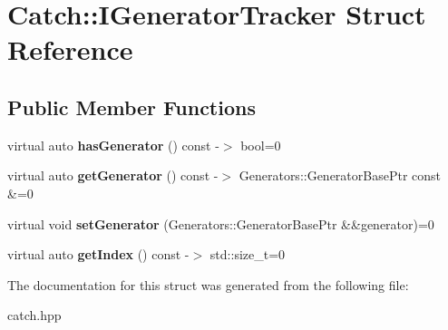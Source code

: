 \hypertarget{structCatch_1_1IGeneratorTracker}{}\section{Catch\+:\+:I\+Generator\+Tracker Struct Reference}
\label{structCatch_1_1IGeneratorTracker}
\subsection*{Public Member Functions}
\begin{DoxyCompactItemize}
\item 
virtual auto {\bfseries has\+Generator} () const -\/$>$ bool=0\hypertarget{structCatch_1_1IGeneratorTracker_ae88084f9af27c8b9a5d5775b9c148498}{}\label{structCatch_1_1IGeneratorTracker_ae88084f9af27c8b9a5d5775b9c148498}

\item 
virtual auto {\bfseries get\+Generator} () const -\/$>$ Generators\+::\+Generator\+Base\+Ptr const \&=0\hypertarget{structCatch_1_1IGeneratorTracker_a23be942fc51672598bfa02c678c3078a}{}\label{structCatch_1_1IGeneratorTracker_a23be942fc51672598bfa02c678c3078a}

\item 
virtual void {\bfseries set\+Generator} (Generators\+::\+Generator\+Base\+Ptr \&\&generator)=0\hypertarget{structCatch_1_1IGeneratorTracker_a9945eff42219edc5a7071eebd8b0419e}{}\label{structCatch_1_1IGeneratorTracker_a9945eff42219edc5a7071eebd8b0419e}

\item 
virtual auto {\bfseries get\+Index} () const -\/$>$ std\+::size\+\_\+t=0\hypertarget{structCatch_1_1IGeneratorTracker_a2922f0d8bc7a732079eadbda78e30f79}{}\label{structCatch_1_1IGeneratorTracker_a2922f0d8bc7a732079eadbda78e30f79}

\end{DoxyCompactItemize}


The documentation for this struct was generated from the following file\+:\begin{DoxyCompactItemize}
\item 
catch.\+hpp\end{DoxyCompactItemize}
